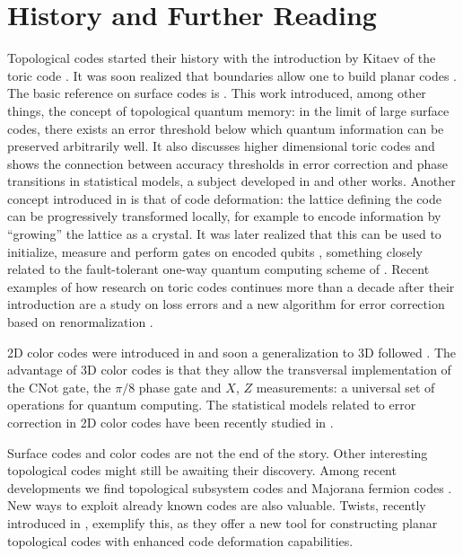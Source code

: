 \documentclass{article}
\begin{document}
\section{History and Further Reading}

Topological codes started their history with the introduction by Kitaev of the toric code \cite{kitaev:1997:181, kitaev:2003:2}. It was soon realized that boundaries allow one to build planar codes \cite{bravyi:1998:9811052, freedman:2001:325}. The basic reference on surface codes is \cite{Dennis:2002:4452}. This work introduced, among other things, the concept of topological quantum memory: in the limit of large surface codes, there exists an error threshold below which quantum information can be preserved arbitrarily well. It also discusses higher dimensional toric codes and shows the connection between accuracy thresholds in error correction and phase transitions in statistical models, a subject developed in \cite{wang:2003:31, ohno:2004:462, takeda:2004:377} and other works. Another concept introduced in \cite{Dennis:2002:4452} is that of code deformation: the lattice defining the code can be progressively transformed locally, for example to encode information by ``growing'' the lattice as a crystal. It was later realized that this can be used to initialize, measure and perform gates on encoded qubits \cite{raussendorf:2007:199,bombin:2009:095302}, something closely related to the fault-tolerant one-way quantum computing scheme of \cite{raussendorf:2006:2242}. Recent examples of how research on toric codes continues more than a decade after their introduction are a study on loss errors \cite{stace:2009:200501} and a new algorithm for error correction based on renormalization \cite{duclos:2010:50504}.

2D color codes were introduced in \cite{bombin:2006:180501} and soon a generalization to 3D followed \cite{bombin:2007:160502}. The advantage of 3D color codes is that they allow the transversal implementation of the CNot gate, the $\pi/8$ phase gate and $X$, $Z$ measurements: a universal set of operations for quantum computing. The statistical models related to error correction in 2D color codes have been recently studied in \cite{katzgraber:2009:090501,katzgraber:2009:012319}.

Surface codes and color codes are not the end of the story. Other interesting topological codes might still be awaiting their discovery. Among recent developments we find topological subsystem codes \cite{bombin:2010:032301} and Majorana fermion codes \cite{bravyi:2010:083039}. New ways to exploit already known codes are also valuable. Twists, recently introduced in \cite{bombin:2010:30403}, exemplify this, as they offer a new tool for constructing planar topological codes with enhanced code deformation capabilities.
\end{document}
